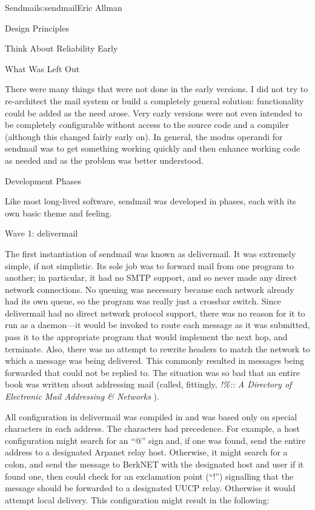 \begin{aosachapter}{Sendmail}{s:sendmail}{Eric Allman}
\begin{aosasect1}{Design Principles}
\begin{aosasect2}{Think About Reliability Early}
\end{aosasect2}

\begin{aosasect2}{What Was Left Out}

There were many things that were not done in the early versions.
I did not try to re-architect the mail system
or build a completely general solution:
functionality could be added as the need arose.
Very early versions were not even intended to be completely configurable
without access to the source code and a compiler
(although this changed fairly early on).
In general, the modus operandi for sendmail
was to get something working quickly
and then enhance working code as needed
and as the problem was better understood.

\end{aosasect2}

\end{aosasect1}

\begin{aosasect1}{Development Phases}

Like most long-lived software, sendmail was developed in phases, each
with its own basic theme and feeling.

\begin{aosasect2}{Wave 1: delivermail}

The first instantiation of sendmail was known as delivermail. It was
extremely simple, if not simplistic. Its sole job was to forward mail
from one program to another; in particular, it had no SMTP support,
and so never made any direct network connections. No queuing
was necessary because each network already had its own queue, so the
program was really just a crossbar switch. Since delivermail had no
direct network protocol support, there was no reason for it to run as
a daemon---it would be invoked to route each message as it was
submitted, pass it to the appropriate program that would implement the
next hop, and terminate.  Also, there was no attempt to rewrite
headers to match the network to which a message was being
delivered. This commonly resulted in messages being forwarded that
could not be replied to. The situation was so bad that an entire book
was written about addressing mail (called, fittingly,
\emph{!\%\@:: A Directory of Electronic Mail Addressing \& Networks}
\cite{bib:adams:email}).

All configuration in delivermail was compiled in and was based only on
special characters in each address.  The characters had
precedence. For example, a host configuration might search for an
``@'' sign and, if one was found, send the entire address to a
designated Arpanet relay host. Otherwise, it might search for a colon,
and send the message to BerkNET with the designated host and user if
it found one, then could check for an exclamation point (``!'')
signalling that the message should be forwarded to a designated UUCP
relay.  Otherwise it would attempt local delivery. This configuration
might result in the following:


\end{aosasect2}
\end{aosasect1}
\end{aosachapter}
